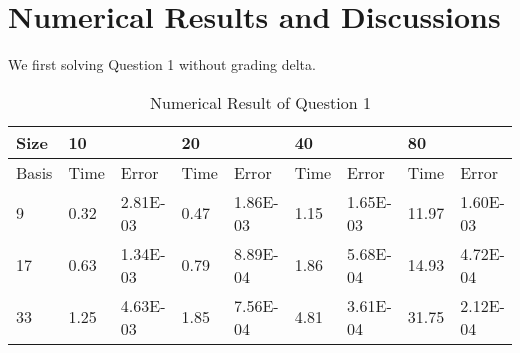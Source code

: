\documentclass{article}
\begin{document}
\section{Numerical Results and Discussions}
We first solving Question 1 without grading delta.
\begin{table}[H]
	\centering
	\caption{Numerical Result of Question 1}
	\begin{tabular}{|l|l|l|l|l|l|l|l|l|}
		\hline
		{\color[HTML]{000000} Size}  & \multicolumn{2}{l|}{{\color[HTML]{000000} 10}}                & \multicolumn{2}{l|}{{\color[HTML]{000000} 20}}                & \multicolumn{2}{l|}{{\color[HTML]{000000} 40}}                & \multicolumn{2}{l|}{{\color[HTML]{000000} 80}}                 \\ \hline
		{\color[HTML]{000000} Basis} & {\color[HTML]{000000} Time} & {\color[HTML]{000000} Error}    & {\color[HTML]{000000} Time} & {\color[HTML]{000000} Error}    & {\color[HTML]{000000} Time} & {\color[HTML]{000000} Error}    & {\color[HTML]{000000} Time}  & {\color[HTML]{000000} Error}    \\ \hline
		{\color[HTML]{000000} 9}     & {\color[HTML]{000000} 0.32} & {\color[HTML]{000000} 2.81E-03} & {\color[HTML]{000000} 0.47} & {\color[HTML]{000000} 1.86E-03} & {\color[HTML]{000000} 1.15} & {\color[HTML]{000000} 1.65E-03} & {\color[HTML]{000000} 11.97} & {\color[HTML]{000000} 1.60E-03} \\ \hline
		{\color[HTML]{000000} 17}    & {\color[HTML]{000000} 0.63} & {\color[HTML]{000000} 1.34E-03} & {\color[HTML]{000000} 0.79} & {\color[HTML]{000000} 8.89E-04} & {\color[HTML]{000000} 1.86} & {\color[HTML]{000000} 5.68E-04} & {\color[HTML]{000000} 14.93} & {\color[HTML]{000000} 4.72E-04} \\ \hline
		{\color[HTML]{000000} 33}    & {\color[HTML]{000000} 1.25} & {\color[HTML]{000000} 4.63E-03} & {\color[HTML]{000000} 1.85} & {\color[HTML]{000000} 7.56E-04} & {\color[HTML]{000000} 4.81} & {\color[HTML]{000000} 3.61E-04} & {\color[HTML]{000000} 31.75} & {\color[HTML]{000000} 2.12E-04} \\ \hline
	\end{tabular}
\end{table}
\end{document}
